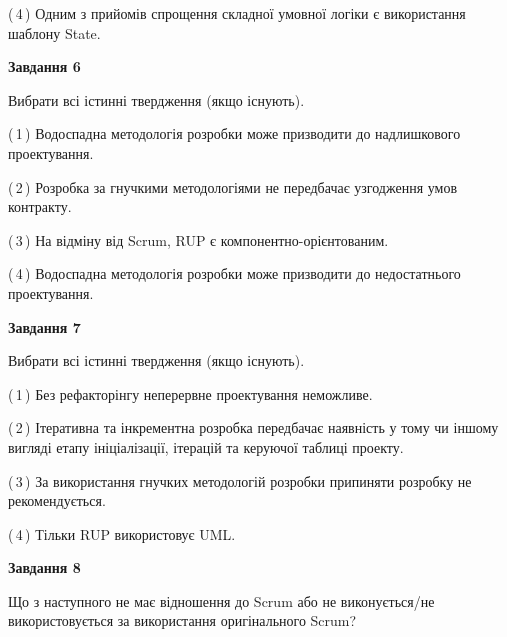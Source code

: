 \documentclass[10pt, ukrainian]{article}
\begin{document}
{\begin {large}
(\,4\,) Одним з прийомів спрощення складної умовної логіки є використання шаблону State. %

\newpage

{\begin {center}\textbf{Завдання 6}\end {center}}\par
Вибрати всі істинні твердження (якщо існують).\par
\vspace{2mm}



(\,1\,) Водоспадна методологія розробки може призводити до надлишкового проектування. %



(\,2\,) Розробка за гнучкими методологіями не передбачає узгодження умов контракту. %



(\,3\,) На відміну від Scrum, RUP є компонентно-орієнтованим. %



(\,4\,) Водоспадна методологія розробки може призводити до недостатнього проектування. %


{\begin {center}\textbf{Завдання 7}\end {center}}\par
Вибрати всі істинні твердження (якщо існують).\par
\vspace{2mm}



(\,1\,) Без рефакторінгу неперервне проектування неможливе. %



(\,2\,) Ітеративна та інкрементна розробка передбачає наявність у тому чи іншому вигляді етапу ініціалізації, ітерацій та керуючої таблиці проекту. %



(\,3\,) За використання гнучких методологій розробки припиняти розробку не рекомендується. %



(\,4\,) Тільки RUP використовує UML.%


{\begin {center}\textbf{Завдання 8}\end {center}}\par
Що з наступного не має відношення до Scrum або не виконується/не використовується за використання оригінального Scrum?\par
\vspace{2mm}




\end{large}}
\end{document}
